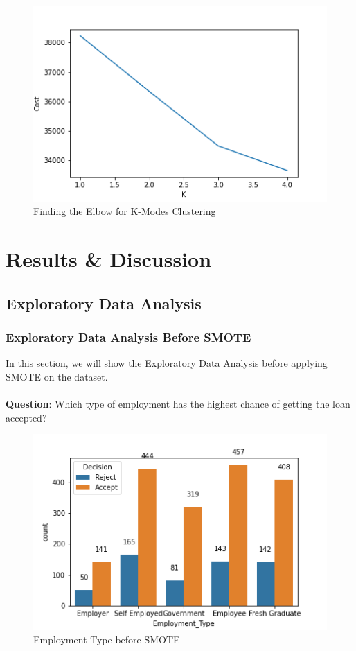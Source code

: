 \documentclass[11pt]{article}
\begin{document}
\begin{figure}[ht]
\centerline{\includegraphics[scale=0.8]{kModeElbow.png} }
\label{fig:kModeElbow}
\caption{Finding the Elbow for K-Modes Clustering}
\end{figure}


\clearpage
\section{Results \& Discussion}
\subsection{Exploratory Data Analysis}
\subsubsection{Exploratory Data Analysis Before SMOTE}
In this section, we will show the Exploratory Data Analysis before applying SMOTE on the dataset. \\ \\
\noindent \textbf{Question}: Which type of employment has the highest chance of getting the loan accepted?
\begin{figure}[h]
\centerline{\includegraphics[scale=0.8]{bSMOTE_employment.png} }
\label{fig:bSmoteEmploy}
\caption{Employment Type before SMOTE}
\end{figure}
\end{document}

